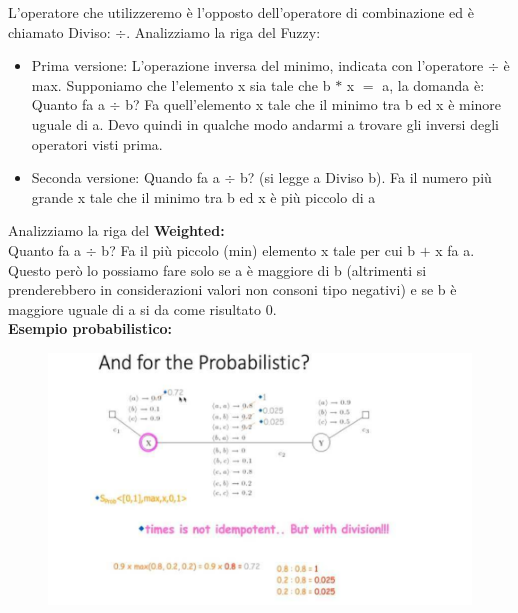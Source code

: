 L'operatore che utilizzeremo è l'opposto dell'operatore di combinazione ed è chiamato Diviso: $\div$. Analizziamo la riga del Fuzzy:
\begin{itemize}
    \item Prima versione: L'operazione inversa del minimo, indicata con l'operatore $\div$ è max. Supponiamo che l'elemento x sia tale che b $*$ x $=$ a, la domanda è: Quanto fa a $\div$ b? Fa quell'elemento x tale che il minimo tra b ed x è minore uguale di a. Devo quindi in qualche modo andarmi a trovare gli inversi degli operatori visti prima.
    \item  Seconda versione: Quando fa a $\div$ b? (si legge a Diviso b). Fa il numero più grande x tale che il minimo tra b ed x è più piccolo di a
\end{itemize}
Analizziamo la riga del \textbf{Weighted:}
\\Quanto fa a $\div$ b? Fa il più piccolo (min) elemento x tale per cui b $+$ x fa a. Questo però lo possiamo fare solo se a è maggiore di b (altrimenti si prenderebbero in considerazioni valori non consoni tipo negativi) e se b è maggiore uguale di a si da come risultato 0.
\\\textbf{Esempio probabilistico:}
\begin{figure}[H]
    \centering
    \includegraphics[width=14cm, keepaspectratio]{img/Cap5/Probabilistic2.png}
\end{figure}

